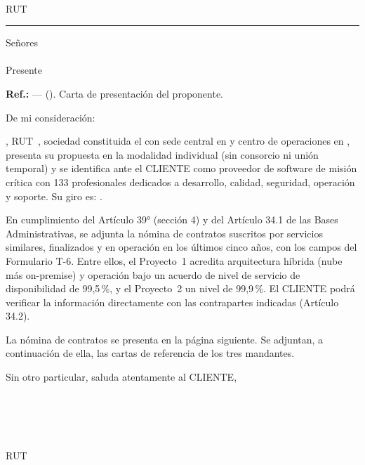 \documentclass[11pt]{article}
\newcommand{\membrete}[2]{%
  \noindent{\SIMsans\Large\bfseries #1}\\[1pt]{\SIMsans\small #2}\\[1pt]\rule{\linewidth}{0.8pt}\par\vspace{4pt}}
\begin{document}
\membrete{LAFROX SpA}{RUT \LFXrut \ \textbullet\ \LFXdomicilio \ \textbullet\ \LFXtelefono \ \textbullet\ \LFXcorreo}

\noindent\SIMfecha\par
\noindent Señores\\\textbf{\LFXcliente}\\Presente\par
\noindent\textbf{Ref.:} \LFXlicitacion{} --- \LFXobjeto{} (\LFXcaso). Carta de presentación del proponente.\par

\noindent De mi consideración:\par

\LFXempresa, RUT~\LFXrut, sociedad constituida el \SIMconstitucion{} con sede central en \SIMsedecentral{} y centro de operaciones en \LFXdomicilio, presenta su propuesta en la modalidad individual (sin consorcio ni unión temporal) y se identifica ante el CLIENTE como proveedor de software de misión crítica con 133 profesionales dedicados a desarrollo, calidad, seguridad, operación y soporte. Su giro es: \SIMgiro.

En cumplimiento del Artículo 39° (sección 4) y del Artículo 34.1 de las Bases Administrativas, se adjunta la nómina de contratos suscritos por servicios similares, finalizados y en operación en los últimos cinco años, con los campos del Formulario T-6. Entre ellos, el Proyecto~1 acredita arquitectura híbrida (nube más on-premise) y operación bajo un acuerdo de nivel de servicio de disponibilidad de 99,5\,\%, y el Proyecto~2 un nivel de 99,9\,\%. El CLIENTE podrá verificar la información directamente con las contrapartes indicadas (Artículo 34.2).

La nómina de contratos se presenta en la página siguiente. Se adjuntan, a continuación de ella, las cartas de referencia de los tres mandantes.

Sin otro particular, saluda atentamente al CLIENTE,

\vspace{34pt}
\begin{center}
  \SIMfirmalinea{6.4cm}{0.5pt}\\[2pt]
  \textbf{\LFXrepresentante}\\\LFXcargo\\\LFXempresa\\ RUT \LFXrut
\end{center}
\end{document}
